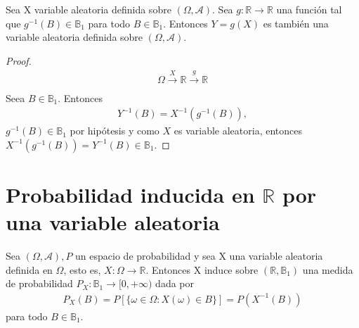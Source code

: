 \begin{teo}
    Sea X variable aleatoria definida sobre  $(\Omega, \mathcal{A})$. Sea $g: \mathbb{R} \longrightarrow \mathbb{R}$ una función tal que $g^{-1}(B) \in \mathbb{B}_1$ para todo $B \in \mathbb{B}_1$. Entonces $Y = g(X)$ es también una variable aleatoria definida sobre  $(\Omega, \mathcal{A})$.
\end{teo}

\begin{proof}
    \begin{align*}
        \Omega \xrightarrow[]{X} \mathbb{R} \xrightarrow[]{g} \mathbb{R}
    \end{align*}
    Seea $B \in \mathbb{B}_1$. Entonces
    \begin{align*}
        Y^{-1}(B) = X^{-1}(g^{-1}(B)),
    \end{align*}
    $g^{-1}(B) \in \mathbb{B}_1$ por hipótesis y como $X$ es variable aleatoria, entonces $X^{-1}(g^{-1}(B)) = Y^{-1}(B) \in \mathbb{B}_1$.
\end{proof}

\section{Probabilidad inducida en $\mathbb{R}$ por una variable aleatoria}
\begin{prop}
    Sea $(\Omega, \mathcal{A}), P$ un espacio de probabilidad y sea X una variable aleatoria definida en $\Omega$, esto es, $X: \Omega \longrightarrow \mathbb{R}$. Entonces X induce sobre $(\mathbb{R}, \mathbb{B}_1)$ una medida de probabilidad $P_X : \mathbb{B}_1 \longrightarrow [0,+\infty)$ dada por
    \begin{align*}
        P_X(B) = P[\{\omega \in \Omega : X(\omega) \in B\}] = P(X^{-1}(B))
    \end{align*}
    para todo $B \in \mathbb{B}_1$.
\end{prop}